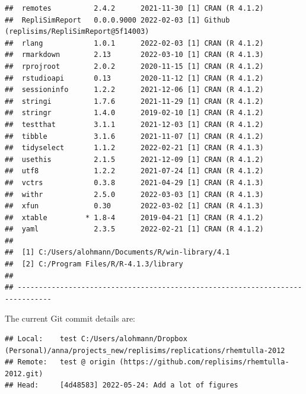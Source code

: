 \documentclass[10,a4paperpaper,]{article}
\begin{document}
\begin{verbatim}
##  remotes          2.4.2      2021-11-30 [1] CRAN (R 4.1.2)
##  RepliSimReport   0.0.0.9000 2022-02-03 [1] Github (replisims/RepliSimReport@5f14003)
##  rlang            1.0.1      2022-02-03 [1] CRAN (R 4.1.2)
##  rmarkdown        2.13       2022-03-10 [1] CRAN (R 4.1.3)
##  rprojroot        2.0.2      2020-11-15 [1] CRAN (R 4.1.2)
##  rstudioapi       0.13       2020-11-12 [1] CRAN (R 4.1.2)
##  sessioninfo      1.2.2      2021-12-06 [1] CRAN (R 4.1.2)
##  stringi          1.7.6      2021-11-29 [1] CRAN (R 4.1.2)
##  stringr          1.4.0      2019-02-10 [1] CRAN (R 4.1.2)
##  testthat         3.1.1      2021-12-03 [1] CRAN (R 4.1.2)
##  tibble           3.1.6      2021-11-07 [1] CRAN (R 4.1.2)
##  tidyselect       1.1.2      2022-02-21 [1] CRAN (R 4.1.3)
##  usethis          2.1.5      2021-12-09 [1] CRAN (R 4.1.2)
##  utf8             1.2.2      2021-07-24 [1] CRAN (R 4.1.2)
##  vctrs            0.3.8      2021-04-29 [1] CRAN (R 4.1.3)
##  withr            2.5.0      2022-03-03 [1] CRAN (R 4.1.3)
##  xfun             0.30       2022-03-02 [1] CRAN (R 4.1.3)
##  xtable         * 1.8-4      2019-04-21 [1] CRAN (R 4.1.2)
##  yaml             2.3.5      2022-02-21 [1] CRAN (R 4.1.2)
## 
##  [1] C:/Users/alohmann/Documents/R/win-library/4.1
##  [2] C:/Program Files/R/R-4.1.3/library
## 
## ------------------------------------------------------------------------------
\end{verbatim}

The current Git commit details are:

\begin{verbatim}
## Local:    test C:/Users/alohmann/Dropbox (Personal)/anna/projects_new/replisims/replications/rhemtulla-2012
## Remote:   test @ origin (https://github.com/replisims/rhemtulla-2012.git)
## Head:     [4d48583] 2022-05-24: Add a lot of figures
\end{verbatim}
\end{document}
